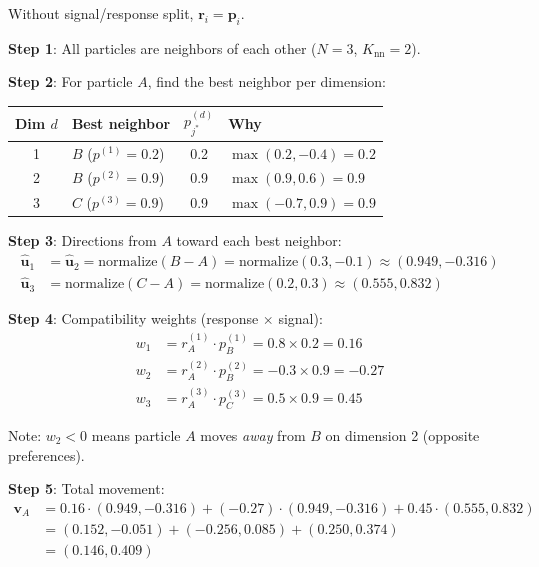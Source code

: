 \documentclass[11pt,a4paper]{article}
\begin{document}
Without signal/response split, $\mathbf{r}_i = \mathbf{p}_i$.

\vspace{0.5em}
\textbf{Step 1}: All particles are neighbors of each other ($N = 3$, $K_{\mathrm{nn}} = 2$).

\textbf{Step 2}: For particle $A$, find the best neighbor per dimension:

\begin{center}
\begin{tabular}{clcl}
\toprule
Dim $d$ & Best neighbor & $p_{j^*}^{(d)}$ & Why \\
\midrule
1 & $B$ ($p^{(1)} = 0.2$) & 0.2 & $\max(0.2, -0.4) = 0.2$ \\
2 & $B$ ($p^{(2)} = 0.9$) & 0.9 & $\max(0.9, 0.6) = 0.9$ \\
3 & $C$ ($p^{(3)} = 0.9$) & 0.9 & $\max(-0.7, 0.9) = 0.9$ \\
\bottomrule
\end{tabular}
\end{center}

\textbf{Step 3}: Directions from $A$ toward each best neighbor:
\begin{align*}
\hat{\mathbf{u}}_1 &= \hat{\mathbf{u}}_2 = \mathrm{normalize}(B - A) = \mathrm{normalize}(0.3, -0.1) \approx (0.949, -0.316) \\
\hat{\mathbf{u}}_3 &= \mathrm{normalize}(C - A) = \mathrm{normalize}(0.2, 0.3) \approx (0.555, 0.832)
\end{align*}

\textbf{Step 4}: Compatibility weights (response $\times$ signal):
\begin{align*}
w_1 &= r_A^{(1)} \cdot p_B^{(1)} = 0.8 \times 0.2 = 0.16 \\
w_2 &= r_A^{(2)} \cdot p_B^{(2)} = -0.3 \times 0.9 = -0.27 \\
w_3 &= r_A^{(3)} \cdot p_C^{(3)} = 0.5 \times 0.9 = 0.45
\end{align*}

Note: $w_2 < 0$ means particle $A$ moves \emph{away} from $B$ on dimension 2 (opposite preferences).

\textbf{Step 5}: Total movement:
\begin{align*}
\mathbf{v}_A &= 0.16 \cdot (0.949, -0.316) + (-0.27) \cdot (0.949, -0.316) + 0.45 \cdot (0.555, 0.832) \\
&= (0.152, -0.051) + (-0.256, 0.085) + (0.250, 0.374) \\
&= (0.146, 0.409)
\end{align*}
\end{document}
